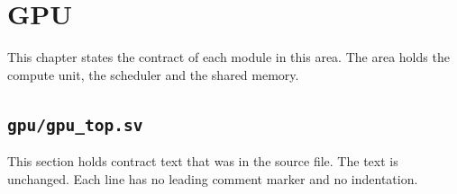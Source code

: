 \chapter{GPU}\label{ds:ch:mod-gpu}

This chapter states the contract of each module in this area. The area holds the compute unit, the scheduler and the shared memory.

\section{\texttt{gpu/gpu\_top.sv}}\label{ds:mod:gpu-top}

This section holds contract text that was in the source file. The text is unchanged. Each line has no leading comment marker and no indentation.

